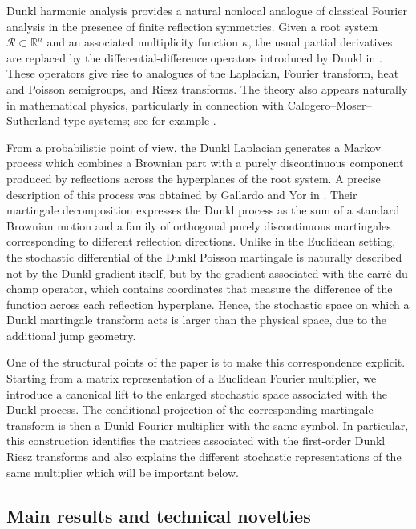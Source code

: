 \documentclass[11pt]{amsart}
\theoremstyle{definition}
\theoremstyle{remark}
\numberwithin{equation}{section}
\newcommand{\R}{\mathbb{R}}
\newcommand{\RR}{\mathcal{R}}
\begin{document}
Dunkl harmonic analysis provides a natural nonlocal analogue of classical Fourier analysis in the presence of finite reflection symmetries. Given a root system $\RR\subset\R^n$ and an associated multiplicity function $\kappa$, the usual partial derivatives are replaced by the differential-difference operators introduced by Dunkl in \cite{Dunkl87}. These operators give rise to analogues of the Laplacian, Fourier transform, heat and Poisson semigroups, and Riesz transforms. The theory also appears naturally in mathematical physics, particularly in connection with Calogero--Moser--Sutherland type systems; see for example \cite{LV}.

From a probabilistic point of view, the Dunkl Laplacian generates a Markov process which combines a Brownian part with a purely discontinuous component produced by reflections across the hyperplanes of the root system. A precise description of this process was obtained by Gallardo and Yor in \cite{GallardoYor2006_Chaotic}. Their martingale decomposition expresses the Dunkl process as the sum of a standard Brownian motion and a family of orthogonal purely discontinuous martingales corresponding to different reflection directions. Unlike in the Euclidean setting, the stochastic differential of the Dunkl Poisson martingale is naturally described not by the Dunkl gradient itself, but by the gradient associated with the carr\'e du champ operator, which contains coordinates that measure the difference of the function across each reflection hyperplane. Hence, the stochastic space on which a Dunkl martingale transform acts is larger than the physical space, due to the additional jump geometry.

One of the structural points of the paper is to make this correspondence explicit. Starting from a matrix representation of a Euclidean Fourier multiplier, we introduce a canonical lift to the enlarged stochastic space associated with the Dunkl process. The conditional projection of the corresponding martingale transform is then a Dunkl Fourier multiplier with the same symbol. In particular, this construction identifies the matrices associated with the first-order Dunkl Riesz transforms and also explains the different stochastic representations of the same multiplier which will be important below.

\subsection{Main results and technical novelties}
\end{document}
